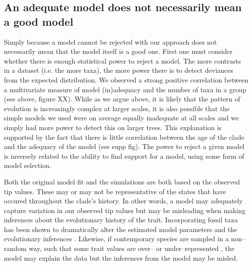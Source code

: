\documentclass[a4paper,12pt]{article}
\begin{document}
\subsection*{An adequate model does not necessarily mean a good model}
Simply because a model cannot be rejected with our approach does not necessarily mean that the model itself is a good one. First one must consider whether there is enough statistical power to reject a model. The more contrasts in a dataset (i.e. the more taxa), the more power there is to detect deviances from the expected distribution. We observed a strong positive correlation between a multivariate measure of model (in)adequacy and the number of taxa in a group (see above, figure XX). While as we argue above, it is likely that the pattern of evolution is increasingly complex at larger scales, it is also possible that the simple models we used were on average equally inadequate at all scales and we simply had more power to detect this on larger trees. This explanation is supported by the fact that there is little correlation between the age of the clade and the adequacy of the model (see supp fig). The power to reject a given model is inversely related to the ability to find support for a model, using some form of model selection.

Both the original model fit and the simulations are both based on the observed tip values. These may or may not be representative of the states that have occured throughout the clade's history. In other words, a model may adequately capture variation in our observed tip values but may be misleading when making inferences about the evolutionary history of the trait. Incorporating fossil taxa has been shown to dramatically alter the estimated model parameters and the evolutionary inferences \citep{FF2006, Slater2012Fossil, SlaterMEE}. Likewise, if contemporary species are sampled in a non--random way, such that some trait values are over-- or under--represented \citep{Freckletoninaction}, the model may explain the data but the inferences from the model may be misled. 
\end{document}
